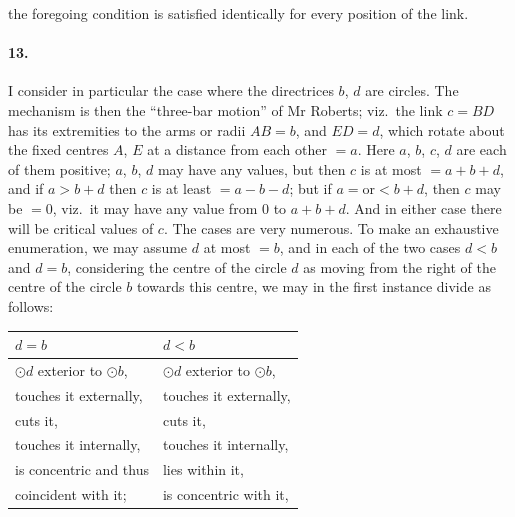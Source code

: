 \documentclass[11pt,a4paper]{article}
\theoremstyle{plain}
\begin{document}
\newpage

the foregoing condition is satisfied identically for every position of the link.

\paragraph{13.} I consider in particular the case where the directrices $b$, $d$ are circles. The mechanism is then the ``three-bar motion'' of Mr Roberts; viz.~the link $c = BD$ has its extremities to the arms or radii $AB = b$, and $ED = d$, which rotate about the fixed centres $A$, $E$ at a distance from each other $= a$. Here $a$, $b$, $c$, $d$ are each of them positive; $a$, $b$, $d$ may have any values, but then $c$ is at most $= a + b + d$, and if $a > b + d$ then $c$ is at least $= a - b - d$; but if $a = \text{or} < b + d$, then $c$ may be $= 0$, viz.~it may have any value from $0$ to $a + b + d$. And in either case there will be critical values of $c$. The cases are very numerous. To make an exhaustive enumeration, we may assume $d$ at most $= b$, and in each of the two cases $d < b$ and $d = b$, considering the centre of the circle $d$ as moving from the right of the centre of the circle $b$ towards this centre, we may in the first instance divide as follows:

\begin{center}
\end{center}

\begin{center}
\begin{tabular}{l|l}
$d = b$ & $d < b$ \\
\hline
$\odot d$ exterior to $\odot b$, & $\odot d$ exterior to $\odot b$, \\
\quad touches it externally, & \quad touches it externally, \\
\quad cuts it, & \quad cuts it, \\
\quad touches it internally, & \quad touches it internally, \\
\quad is concentric and thus & \quad lies within it, \\
\quad coincident with it; & \quad is concentric with it,
\end{tabular}
\end{center}
\end{document}
